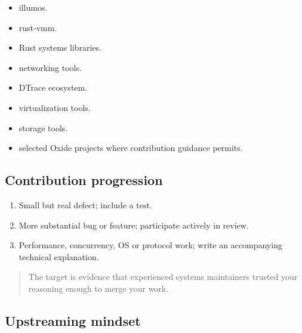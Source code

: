 \documentclass[11pt,letterpaper]{article}
\begin{document}
\begin{itemize}

\item illumos.

\item rust-vmm.

\item Rust systems libraries.

\item networking tools.

\item DTrace ecosystem.

\item virtualization tools.

\item storage tools.

\item selected Oxide projects where contribution guidance permits.

\end{itemize}

\subsection*{Contribution progression}

\begin{enumerate}

\item Small but real defect; include a test.

\item More substantial bug or feature; participate actively in review.

\item Performance, concurrency, OS or protocol work; write an accompanying technical explanation.

\end{enumerate}

\begin{quote}
The target is evidence that experienced systems maintainers trusted your reasoning enough to merge your work.
\end{quote}

\subsection*{Upstreaming mindset}
\end{document}
